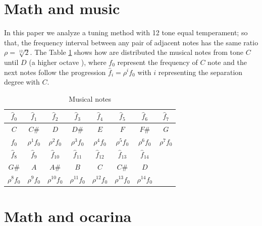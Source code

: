 \documentclass{article}
\begin{document}
\section{Math and music}
In this paper we analyze a tuning method with 12 tone equal temperament; so that, the frequency interval
between any pair of adjacent notes has the same ratio $\rho = {\sqrt[12]{2}}$.
The Table \ref{tab:notes} shows how are distributed the musical notes from tone $C$ until $D$ (a higher octave ),
where $f_0$ represent the frequency of $C$ note and the next notes
follow the progression $\hat{f}_{i}={\rho}^i f_{0}$ with $i$ representing the separation degree with $C$. 

\begin{table}[h]
\center
{\renewcommand{\arraystretch}{1.5}
\begin{tabular}{|c|c|c|c|c|c|c|c|}
\hline
$\hat{f}_{0}$ & $\hat{f}_{1}$ & $\hat{f}_{2}$ & $\hat{f}_{3}$ & $\hat{f}_{4}$ & $\hat{f}_{5}$ & $\hat{f}_{6}$ & $\hat{f}_{7}$ \\ \hline
$C$ & $C\#$ & $D$ & $D\#$ & $E$ & $F$ & $F\#$ & $G$ \\ \hline
$f_{0}$ & ${\rho}^1 f_{0}$ & ${\rho}^2 f_{0}$ & ${\rho}^3 f_{0}$ & ${\rho}^4 f_{0}$ & ${\rho}^5 f_{0}$ & ${\rho}^6 f_{0}$ & ${\rho}^7 f_{0}$  \\ \hline
\hline 
$\hat{f}_{8}$ & $\hat{f}_{9}$ & $\hat{f}_{10}$ & $\hat{f}_{11}$ & $\hat{f}_{12}$ & $\hat{f}_{13}$ & $\hat{f}_{14}$ & ~ \\ \hline
$G\#$ & $A$ & $A\#$ & $B$ & $C$ & $C\#$ & $D$  & ~\\ \hline
${\rho}^8 f_{0}$ & ${\rho}^9 f_{0}$ & ${\rho}^{10} f_{0}$ & ${\rho}^{11} f_{0}$ & ${\rho}^{12} f_{0}$ & ${\rho}^{13} f_{0}$ & ${\rho}^{14} f_{0}$ & ~ \\ 
\hline
\end{tabular}
}
\vspace{5pt}
\caption{Musical notes}
\label{tab:notes}
\end{table}


\section{Math and ocarina}
\end{document}

